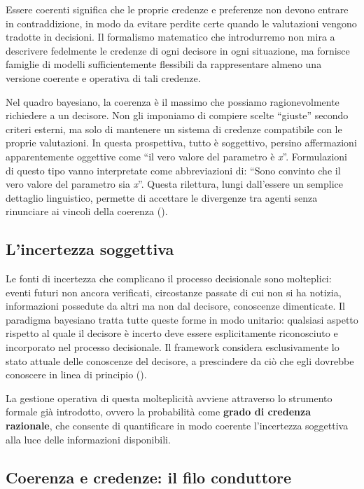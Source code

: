 \documentclass[
  italian,
  letterpaper,
  a4paper,
  11pt,
  open=any]{scrbook}
\theoremstyle{plain}
\theoremstyle{definition}
\theoremstyle{definition}
\theoremstyle{remark}
\begin{document}
Essere coerenti significa che le proprie credenze e preferenze non
devono entrare in contraddizione, in modo da evitare perdite certe
quando le valutazioni vengono tradotte in decisioni. Il formalismo
matematico che introdurremo non mira a descrivere fedelmente le credenze
di ogni decisore in ogni situazione, ma fornisce famiglie di modelli
sufficientemente flessibili da rappresentare almeno una versione
coerente e operativa di tali credenze.

Nel quadro bayesiano, la coerenza è il massimo che possiamo
ragionevolmente richiedere a un decisore. Non gli imponiamo di compiere
scelte ``giuste'' secondo criteri esterni, ma solo di mantenere un
sistema di credenze compatibile con le proprie valutazioni. In questa
prospettiva, tutto è soggettivo, persino affermazioni apparentemente
oggettive come ``il vero valore del parametro è \emph{x}''. Formulazioni
di questo tipo vanno interpretate come abbreviazioni di: ``Sono convinto
che il vero valore del parametro sia \emph{x}''. Questa rilettura, lungi
dall'essere un semplice dettaglio linguistico, permette di accettare le
divergenze tra agenti senza rinunciare ai vincoli della coerenza
().

\subsection{L'incertezza soggettiva}\label{lincertezza-soggettiva}

Le fonti di incertezza che complicano il processo decisionale sono
molteplici: eventi futuri non ancora verificati, circostanze passate di
cui non si ha notizia, informazioni possedute da altri ma non dal
decisore, conoscenze dimenticate. Il paradigma bayesiano tratta tutte
queste forme in modo unitario: qualsiasi aspetto rispetto al quale il
decisore è incerto deve essere esplicitamente riconosciuto e incorporato
nel processo decisionale. Il framework considera esclusivamente lo stato
attuale delle conoscenze del decisore, a prescindere da ciò che egli
dovrebbe conoscere in linea di principio
().

La gestione operativa di questa molteplicità avviene attraverso lo
strumento formale già introdotto, ovvero la probabilità come
\textbf{grado di credenza razionale}, che consente di quantificare in
modo coerente l'incertezza soggettiva alla luce delle informazioni
disponibili.

\subsection{Coerenza e credenze: il filo
conduttore}\label{coerenza-e-credenze-il-filo-conduttore}
\end{document}
